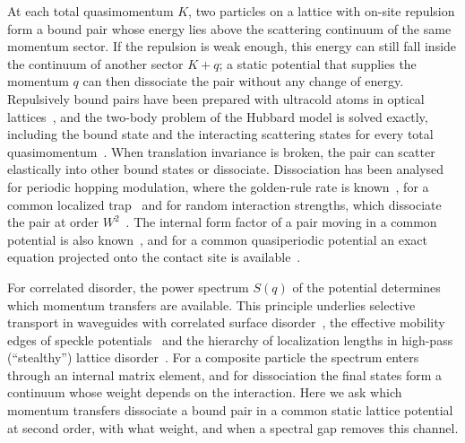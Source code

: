 \documentclass[12pt,a4paper]{article}
\theoremstyle{remark}
\begin{document}
At each total quasimomentum $K$, two particles on a lattice with on-site repulsion form a bound pair whose energy lies above the scattering continuum of the same momentum sector. If the repulsion is weak enough, this energy can still fall inside the continuum of another sector $K+q$; a static potential that supplies the momentum $q$ can then dissociate the pair without any change of energy. Repulsively bound pairs have been prepared with ultracold atoms in optical lattices~\cite{Winkler2006}, and the two-body problem of the Hubbard model is solved exactly, including the bound state and the interacting scattering states for every total quasimomentum~\cite{ValientePetrosyan2008}. When translation invariance is broken, the pair can scatter elastically into other bound states or dissociate. Dissociation has been analysed for periodic hopping modulation, where the golden-rule rate is known~\cite{Javanainen2010}, for a common localized trap~\cite{MaksimovKolovsky2014} and for random interaction strengths, which dissociate the pair at order $W^2$~\cite{Perrin2021}. The internal form factor of a pair moving in a common potential is also known~\cite{TurekJohn2003}, and for a common quasiperiodic potential an exact equation projected onto the contact site is available~\cite{DufourOrso2012}.

For correlated disorder, the power spectrum $S(q)$ of the potential determines which momentum transfers are available. This principle underlies selective transport in waveguides with correlated surface disorder~\cite{IzrailevMakarov2003,IzrailevMakarov2004}, the effective mobility edges of speckle potentials~\cite{Lugan2009,GurevichKenneth2009} and the hierarchy of localization lengths in high-pass (``stealthy'') lattice disorder~\cite{Vanoni2026}. For a composite particle the spectrum enters through an internal matrix element, and for dissociation the final states form a continuum whose weight depends on the interaction. Here we ask which momentum transfers dissociate a bound pair in a common static lattice potential at second order, with what weight, and when a spectral gap removes this channel.
\end{document}
